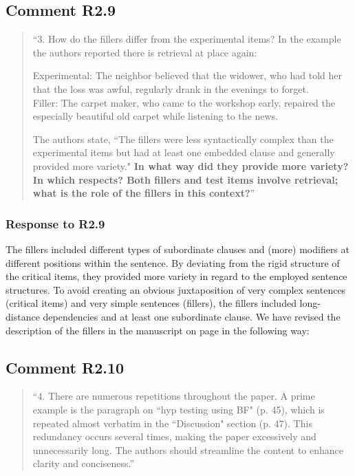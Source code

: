 \documentclass[12pt]{article}
\begin{document}
\subsection*{Comment R2.9}
\begin{quote}
``3. How do the fillers differ from the experimental items? In the example the authors reported there is retrieval at place again:

Experimental: The neighbor believed that the widower, who had told her that the loss was awful, regularly drank in the evenings to forget.\\
Filler: The carpet maker, who came to the workshop early, repaired the especially beautiful old carpet while listening to the news.

The authors state, ``The fillers were less syntactically complex than the experimental items but had at least one embedded clause and generally provided more variety." \textbf{In what way did they provide more variety? In which respects? Both fillers and test items involve retrieval; what is the role of the fillers in this context?}''
\end{quote}
\subsubsection*{Response to R2.9}
The fillers included different types of subordinate clauses and (more) modifiers at different positions within the sentence. By deviating from the rigid structure of the critical items, they provided more variety in regard to the employed sentence structures. To avoid creating an obvious juxtaposition of very complex sentences (critical items) and very simple sentences (fillers), the fillers included long-distance dependencies and at least one subordinate clause. We have revised the description of the fillers in the manuscript on page \pageref{fillers} in the following way:

\begin{quote}
\end{quote}
 
\subsection*{Comment R2.10}
\begin{quote}
``4. There are numerous repetitions throughout the paper. A prime example is the paragraph on ``hyp testing using BF" (p. 45), which is repeated almost verbatim in the ``Discussion" section (p. 47). This redundancy occurs several times, making the paper excessively and unnecessarily long. The authors should streamline the content to enhance clarity and conciseness.''
\end{quote}
\end{document}

